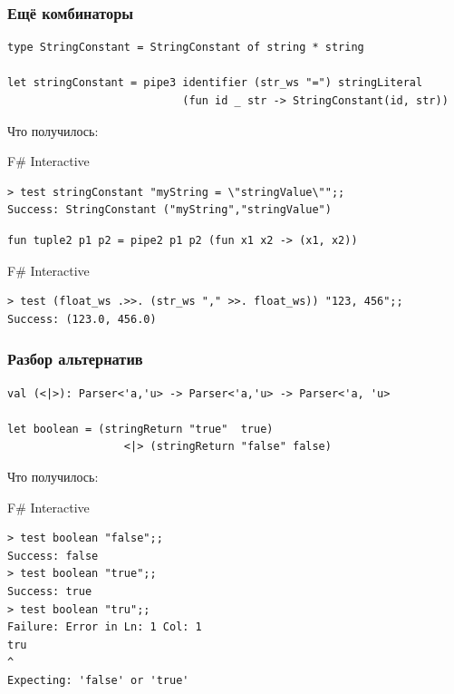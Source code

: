 \documentclass[xetex,mathserif,serif]{beamer}
\begin{document}
    \begin{frame}[fragile]
        \frametitle{Ещё комбинаторы}
        \begin{verbatim}
type StringConstant = StringConstant of string * string

let stringConstant = pipe3 identifier (str_ws "=") stringLiteral
                           (fun id _ str -> StringConstant(id, str))
        \end{verbatim}
        Что получилось:
        \begin{alertblock}{F\# Interactive}
            \begin{verbatim}
> test stringConstant "myString = \"stringValue\"";;
Success: StringConstant ("myString","stringValue")
            \end{verbatim}
        \end{alertblock}

        \begin{verbatim}
fun tuple2 p1 p2 = pipe2 p1 p2 (fun x1 x2 -> (x1, x2))
        \end{verbatim}

        \begin{alertblock}{F\# Interactive}
            \begin{verbatim}
> test (float_ws .>>. (str_ws "," >>. float_ws)) "123, 456";;
Success: (123.0, 456.0)
            \end{verbatim}
        \end{alertblock}
    \end{frame}

    \begin{frame}[fragile]
        \frametitle{Разбор альтернатив}
        \begin{small}
            \begin{verbatim}
val (<|>): Parser<'a,'u> -> Parser<'a,'u> -> Parser<'a, 'u>

let boolean = (stringReturn "true"  true)
                  <|> (stringReturn "false" false)
            \end{verbatim}
            Что получилось:
            \begin{alertblock}{F\# Interactive}
                \begin{verbatim}
> test boolean "false";;
Success: false
> test boolean "true";;
Success: true
> test boolean "tru";;
Failure: Error in Ln: 1 Col: 1
tru
^
Expecting: 'false' or 'true'
                \end{verbatim}
            \end{alertblock}
        \end{small}
    \end{frame}
\end{document}
